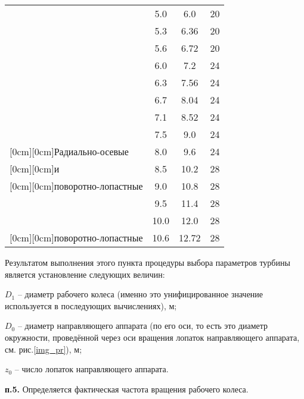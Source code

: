 \begin{table}[ht]
\begin{tabular}{|l|c|c|c|}
    & 5.0 & 6.0 & 20\\
\cline{2-4}
    & 5.3 & 6.36 & 20\\
\cline{2-4}
    & 5.6 & 6.72 & 20\\
\cline{2-4}
    & 6.0 & 7.2 & 24\\
\cline{2-4}

    & 6.3 & 7.56 & 24\\
\cline{2-4}
    & 6.7 & 8.04 & 24\\
\cline{2-4}
    & 7.1 & 8.52 & 24\\
\cline{2-4}
    & 7.5 & 9.0 & 24\\
\cline{2-4}

\raisebox{35ex}[0cm][0cm]{Радиально-осевые} & 8.0 & 9.6 & 24  \\
\cline{2-4}
\raisebox{35ex}[0cm][0cm]{и} & 8.5 & 10.2 & 28  \\
\cline{2-4}
\raisebox{35ex}[0cm][0cm]{поворотно-лопастные} & 9.0 & 10.8 & 28  \\

\hline
\hline


    & 9.5 & 11.4 & 28\\
\cline{2-4}
    & 10.0 & 12.0 & 28\\
\cline{2-4}

\cline{2-4}
\raisebox{2.5ex}[0cm][0cm]{поворотно-лопастные} & 10.6 & 12.72 & 28  \\


\hline
\end{tabular}
\end{table}


\vspace{0.5cm}

Результатом выполнения  этого пункта процедуры выбора параметров турбины является установление следующих величин:

$D_1$ -- диаметр рабочего колеса (именно это унифицированное значение используется в последующих вычислениях), м;

$D_0$ -- диаметр направляющего аппарата (по его оси, то есть это диаметр окружности, проведённой через оси вращения лопаток направляющего аппарата, см. рис.\ref{img_pr}), м;

$z_0$ -- число лопаток направляющего аппарата.






\vspace{1cm}

\textbf{п.5.} Определяется фактическая частота вращения рабочего колеса.

